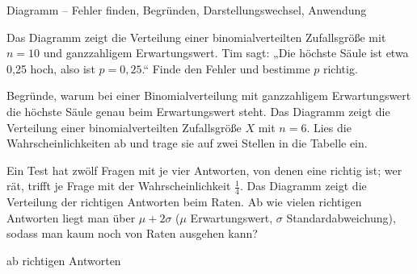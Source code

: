 \begin{aufgabe}{Diagramm – Fehler finden, Begründen, Darstellungswechsel, Anwendung}
\begin{teile}
\teil Das Diagramm zeigt die Verteilung einer binomialverteilten Zufallsgröße mit $n = 10$ und ganzzahligem Erwartungswert. Tim sagt: „Die höchste Säule ist etwa 0{,}25 hoch, also ist $p = 0{,}25$.“ Finde den Fehler und bestimme $p$ richtig.

\teil Begründe, warum bei einer Binomialverteilung mit ganzzahligem Erwartungswert die höchste Säule genau beim Erwartungswert steht.
\teil Das Diagramm zeigt die Verteilung einer binomialverteilten Zufallsgröße $X$ mit $n = 6$. Lies die Wahrscheinlichkeiten ab und trage sie auf zwei Stellen in die Tabelle ein.

 
\teil Ein Test hat zwölf Fragen mit je vier Antworten, von denen eine richtig ist; wer rät, trifft je Frage mit der Wahrscheinlichkeit $\frac{1}{4}$. Das Diagramm zeigt die Verteilung der richtigen Antworten beim Raten. Ab wie vielen richtigen Antworten liegt man über $\mu + 2\sigma$ ($\mu$ Erwartungswert, $\sigma$ Standardabweichung), sodass man kaum noch von Raten ausgehen kann?

ab \leerfeld richtigen Antworten
\end{teile}
\end{aufgabe}
